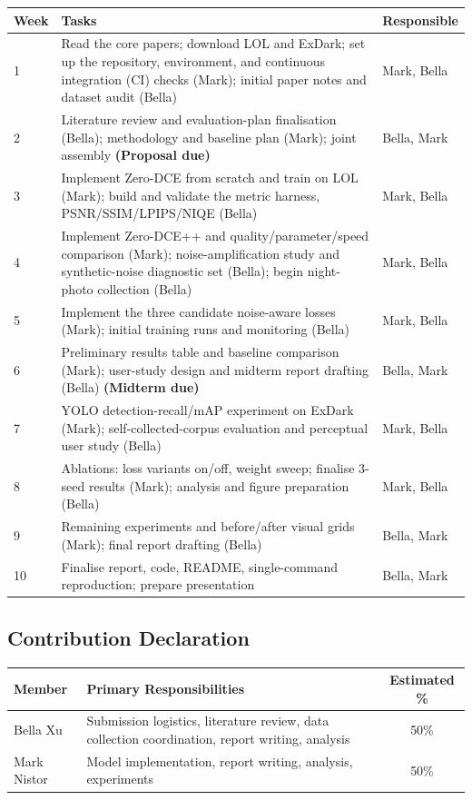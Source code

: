 \documentclass[11pt, letterpaper]{article}
\begin{document}
\begin{center}
\begin{tabular}{lp{9.5cm}l}
\toprule
\textbf{Week} & \textbf{Tasks} & \textbf{Responsible} \\
\midrule
1 & Read the core papers; download LOL and ExDark; set up the repository, environment, and continuous integration (CI) checks (Mark); initial paper notes and dataset audit (Bella) & Mark, Bella \\
2 & Literature review and evaluation-plan finalisation (Bella); methodology and baseline plan (Mark); joint assembly \textbf{(Proposal due)} & Bella, Mark \\
3 & Implement Zero-DCE from scratch and train on LOL (Mark); build and validate the metric harness, PSNR/SSIM/LPIPS/NIQE (Bella) & Mark, Bella \\
4 & Implement Zero-DCE++ and quality/parameter/speed comparison (Mark); noise-amplification study and synthetic-noise diagnostic set (Bella); begin night-photo collection (Bella) & Mark, Bella \\
5 & Implement the three candidate noise-aware losses (Mark); initial training runs and monitoring (Bella) & Mark, Bella \\
6 & Preliminary results table and baseline comparison (Mark); user-study design and midterm report drafting (Bella) \textbf{(Midterm due)} & Bella, Mark \\
7 & YOLO detection-recall/mAP experiment on ExDark (Mark); self-collected-corpus evaluation and perceptual user study (Bella) & Mark, Bella \\
8 & Ablations: loss variants on/off, weight sweep; finalise 3-seed results (Mark); analysis and figure preparation (Bella) & Mark, Bella \\
9 & Remaining experiments and before/after visual grids (Mark); final report drafting (Bella) & Bella, Mark \\
10 & Finalise report, code, README, single-command reproduction; prepare presentation & Bella, Mark \\
\bottomrule
\end{tabular}
\end{center}

\subsection{Contribution Declaration}

\begin{tabular}{lp{10cm}c}
\toprule
\textbf{Member} & \textbf{Primary Responsibilities} & \textbf{Estimated \%} \\
\midrule
{Bella Xu} &   Submission logistics, literature review, data collection coordination, report writing, analysis & 50\%  \\
{Mark Nistor} & Model implementation, report writing, analysis, experiments & 50\%  \\

\bottomrule
\end{tabular}
\newpage
\end{document}
